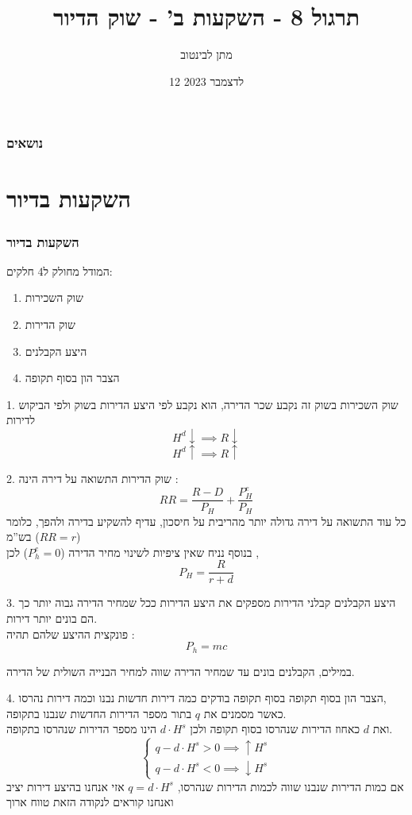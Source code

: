 \documentclass[usenames,dvipsnames]{beamer}
\title{תרגול 8 - השקעות ב' - שוק הדיור}
\author{\texthebrew{ מתן לבינטוב}}
\institute[{{ אב"ג}}]{{ אוניברסיטת בן גוריון בנגב}}
\date{12 לדצמבר 2023}
\begin{document}
\begin{RTL}
\begin{frame}
\titlepage
\end{frame}

\begin{frame}
    \frametitle{נושאים}
    \tableofcontents
\end{frame}

\section{השקעות בדיור}
\begin{frame}[allowframebreaks]
    \frametitle{השקעות בדיור}
המודל מחולק ל4 חלקים: 
\begin{enumerate}
    \item שוק השכירות
    \item שוק הדירות
    \item היצע הקבלנים
    \item הצבר הון בסוף תקופה
\end{enumerate}
    
\framebreak

\begin{block}{1. שוק השכירות}
    בשוק זה נקבע שכר הדירה, הוא נקבע לפי היצע הדירות בשוק ולפי הביקוש לדירות
    $$ H^d \downarrow \implies R \downarrow $$
    $$ H^d \uparrow \implies R \uparrow $$
\end{block}
\framebreak
\begin{block}{2. שוק הדירות}
    התשואה על דירה הינה :
    $$ RR = \frac{R - D }{P_H} + \frac{P_H^{e}}{P_H} $$
    כל עוד התשואה על דירה גדולה יותר מהריבית על חיסכון, עדיף להשקיע בדירה ולהפך, כלומר בש''מ ($RR = r$)
    \\
     בנוסף נניח שאין ציפיות לשינוי מחיר הדירה ($P_h^e = 0 $)
    לכן ,
    $$P_H = \frac{R}{r+d}$$
\end{block}
\framebreak
\begin{block}{3. היצע הקבלנים}
    קבלני הדירות מספקים את היצע הדירות ככל שמחיר הדירה גבוה יותר כך הם בונים יותר דירות.
    \\
    פונקצית ההיצע שלהם תהיה :
    $$P_h = mc $$

    במילים, הקבלנים בונים עד שמחיר הדירה שווה למחיר הבנייה השולית של הדירה.
    
\end{block}

\framebreak
\begin{block}{4. הצבר הון בסוף תקופה}
    בסוף תקופה בודקים כמה דירות חדשות נבנו וכמה דירות נהרסו, \\ 
    כאשר מסמנים את $q$ בתור מספר הדירות החדשות שנבנו בתקופה.\\
    ואת $d$ כאחוז הדירות שנהרסו בסוף תקופה ולכן $d \cdot H^s$ הינו מספר הדירות שנהרסו בתקופה.
    $$\begin{cases}
        q - d \cdot H^s > 0 \implies \uparrow H^s \\
        q - d \cdot H^s < 0 \implies \downarrow H^s   
    \end{cases}$$
    אם כמות הדירות שנבנו שווה לכמות הדירות שנהרסו, $q = d\cdot H^s$ אזי אנחנו בהיצע דירות יציב ואנחנו קוראים לנקודה הזאת טווח ארוך
\end{block}


\end{frame}
\end{RTL}
\end{document}
